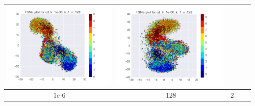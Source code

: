 \documentclass[12pt]{report}
\begin{document}
\begin{table}[H]
\begin{tabular}{ | c | c | c | c || c |}
\begin{minipage}{.3\textwidth}
      \includegraphics[scale=0.25]{cd_lr_1e-06_k_1_n_128.png}
    \end{minipage} &
    \begin{minipage}{.3\textwidth}
      \includegraphics[scale=0.25]{test_cd_lr_1e-06_k_1_n_128.png}
    \end{minipage}
        \\ \hline
     1e-6 & 128 & 2 &
    \begin{minipage}{.3\textwidth}

\end{minipage}
\end{tabular}
\end{table}
\end{document}
